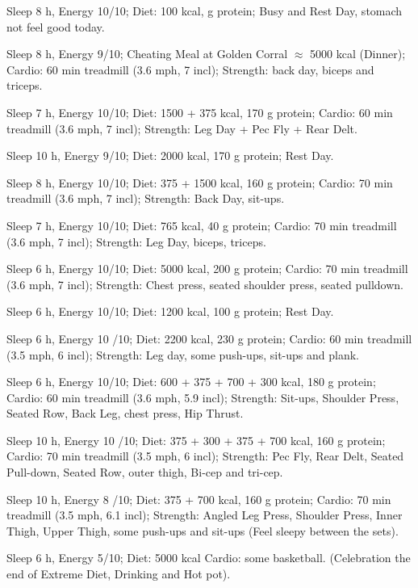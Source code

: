 
\item [Oct 31] Sleep 8 h, Energy 10/10; Diet: 100 kcal, g protein; Busy and Rest Day, stomach not feel good today.
\item [Oct 30] Sleep 8 h, Energy 9/10; Cheating Meal at Golden Corral $\approx$ 5000 kcal (Dinner); Cardio: 60 min treadmill (3.6 mph, 7 incl); Strength: back day, biceps and triceps.
\item [Oct 29] Sleep 7 h, Energy 10/10; Diet: 1500 + 375 kcal, 170 g protein; Cardio: 60 min treadmill (3.6 mph, 7 incl); Strength: Leg Day + Pec Fly + Rear Delt.
\item [Oct 28] Sleep 10 h, Energy 9/10; Diet: 2000 kcal, 170 g protein; Rest Day.
\item [Oct 27] Sleep 8 h, Energy 10/10; Diet: 375 + 1500 kcal, 160 g protein; Cardio: 70 min treadmill (3.6 mph, 7 incl); Strength: Back Day, sit-ups.
\item [Oct 26] Sleep 7 h, Energy 10/10; Diet: 765 kcal, 40 g protein; Cardio: 70 min treadmill (3.6 mph, 7 incl); Strength: Leg Day, biceps, triceps.
\item [Oct 25] Sleep 6 h, Energy 10/10; Diet: 5000 kcal, 200 g protein; Cardio: 70 min treadmill (3.6 mph, 7 incl); Strength: Chest press, seated shoulder press, seated pulldown.
\item [Oct 24] Sleep 6 h, Energy 10/10; Diet: 1200 kcal, 100 g protein; Rest Day.
\item [Oct 23] Sleep 6 h, Energy 10 /10; Diet: 2200 kcal, 230 g protein; Cardio: 60 min treadmill (3.5 mph, 6 incl); Strength: Leg day, some push-ups, sit-ups and plank.
\item [Oct 22] Sleep 6 h, Energy 10/10; Diet: 600 + 375 + 700 + 300 kcal, 180 g protein; Cardio: 60 min treadmill (3.6 mph, 5.9 incl); Strength: Sit-ups, Shoulder Press, Seated Row, Back Leg, chest press, Hip Thrust.
\item [Oct 21] Sleep 10 h, Energy 10 /10; Diet: 375 + 300 + 375 + 700 kcal, 160 g protein; Cardio: 70 min treadmill (3.5 mph, 6 incl); Strength: Pec Fly, Rear Delt, Seated Pull-down, Seated Row, outer thigh, Bi-cep and tri-cep.
\item [Oct 20] Sleep 10 h, Energy 8 /10; Diet: 375 + 700 kcal, 160 g protein; Cardio: 70 min treadmill (3.5 mph, 6.1 incl); Strength: Angled Leg Press, Shoulder Press, Inner Thigh, Upper Thigh, some push-ups and sit-ups (Feel sleepy between the sets).
\item [Oct 19] Sleep 6 h, Energy 5/10; Diet: 5000 kcal Cardio: some basketball. (Celebration the end of Extreme Diet, Drinking and Hot pot).
